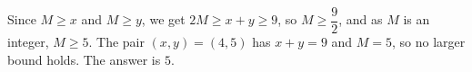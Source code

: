 Since $M\ge x$ and $M\ge y$, we get $2M\ge x+y\ge9$, so $M\ge\dfrac{9}{2}$, and as $M$ is an integer, $M\ge5$. The pair $(x,y)=(4,5)$ has $x+y=9$ and $M=5$, so no larger bound holds. The answer is $\boxed{5}$.
